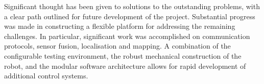 Significant thought has been given to solutions to the outstanding problems, with
a clear path outlined for future development of the project. Substantial progress
was made in constructing a flexible platform for addressing the remaining
challenges. In particular, significant work was accomplished on communication
protocols, sensor fusion, localisation and mapping.
A combination of the configurable testing environment, the robust mechanical
construction of the robot, and the modular software architecture allows for rapid
development of additional control systems.
